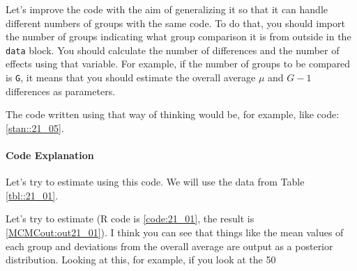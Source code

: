 \documentclass{ltjsbook}
\begin{document}
Let's improve the code with the aim of generalizing it so that it can handle different numbers of groups with the same code.
To do that, you should import the number of groups indicating what group comparison it is from outside in the \verb|data| block.
You should calculate the number of differences and the number of effects using that variable. For example, if the number of groups to be compared is \verb|G|, it means that you should estimate the overall average $\mu$ and $G-1$ differences as parameters.

The code written using that way of thinking would be, for example, like code:\ref{stan::21_05}.



\paragraph{Code Explanation}


Let's try to estimate using this code. We will use the data from Table \ref{tbl::21_01}.


Let's try to estimate (R code is \ref{code:21_01}, the result is \ref{MCMCout:out21_01}).
I think you can see that things like the mean values of each group and deviations from the overall average are output as a posterior distribution. Looking at this, for example, if you look at the 50%
\end{document}
